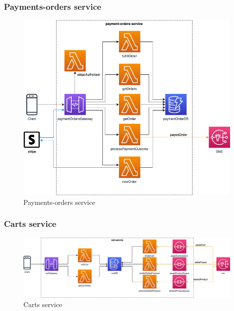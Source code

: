 \subsubsection{Payments-orders service}
\begin{figure}[H]
	\centering
	\includegraphics[scale=0.4]{Immagini/Backend/AWSPaymentOrders.png}
	\caption{Payments-orders service}
	\label{fig:Payment-orders}
\end{figure}

\subsubsection{Carts service}
\begin{figure}[H]
	\centering
	\includegraphics[scale=0.4]{Immagini/Backend/AWSCart.png}
	\caption{Carts service}
	\label{fig:Cart}
\end{figure}


